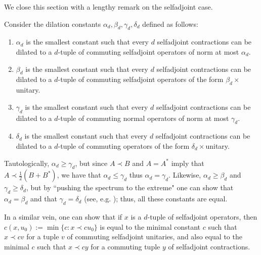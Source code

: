 We close this section with a lengthy remark on the selfadjoint case. 
\begin{remark}\label{rem:selfadjoint}
Consider the dilation constants $\alpha_d, \beta_d, \gamma_d, \delta_d$ defined as follows:
\begin{enumerate}
\item $\alpha_d$ is the smallest constant such that every $d$ selfadjoint contractions can be dilated to a $d$-tuple of commuting selfadjoint operators of norm at most $\alpha_d$. 
\item $\beta_d$ is the smallest constant such that every $d$ selfadjoint contractions can be dilated to a $d$-tuple of commuting selfadjoint operators of the form $\beta_d \times$unitary.
\item $\gamma_d$ is the smallest constant such that every $d$ selfadjoint contractions can be dilated to a $d$-tuple of commuting normal operators of norm at most $\gamma_d$. 
\item $\delta_d$ is the smallest constant such that every $d$ selfadjoint contractions can be dilated to a $d$-tuple of commuting operators of the form $\delta_d \times$unitary.
\end{enumerate}
Tautologically, $\alpha_d \geq \gamma_d$, but since $A \prec B$ and $A = A^*$ imply that $A \prec \frac{1}{2}(B+B^*)$, we have that $\alpha_d \leq \gamma_d$ thus $\alpha_d = \gamma_d$. 
Likewise, $\alpha_d \geq \beta_d$ and $\gamma_d \geq \delta_d$, but by ``pushing the spectrum to the extreme" one can show that $\alpha_d = \beta_d$ and that $\gamma_d = \delta_d$ (see, e.g. \cite[Proposition 2.3]{PSS18}); thus, all these constants are equal. 

In a similar vein, one can show that if $x$ is a $d$-tuple of selfadjoint operators, then $c(x,u_0) := \min \{ c : x \prec cu_0 \}$ is equal to the minimal constant $c$ such that $x \prec c v$ for a tuple $v$ of commuting selfadjoint unitaries, and also equal to the minimal $c$ such that $x \prec c y$ for a commuting tuple $y$ of selfadjoint contractions. 


\end{remark}

